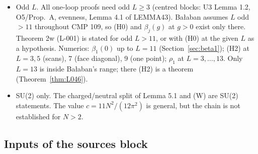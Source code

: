 \begin{itemize}
\item[11.] Odd $L$. All one-loop proofs need odd $L\ge3$ (centred blocks: U3 Lemma 1.2, O5/Prop.\ A, evenness, Lemma 4.1 of LEMMA43). Ba{\l}aban assumes $L$ odd $>11$ throughout CMP 109, so (H0) and $\beta_j(g)$ at $g>0$ exist only there. Theorem 2w (L-001) is stated for odd $L>11$, or with (H0) at the given $L$ as a hypothesis. Numerics: $\beta_1(0)$ up to $L=11$ (Section~\ref{sec:beta1}); (H2) at $L=3,5$ (scans), 7 (face diagonal), 9 (one point); $\rho_1$ at $L=3,\dots,13$. Only $L=13$ is inside Ba{\l}aban's range; there (H2) is a theorem (Theorem~\ref{thm:L046}).
\item[12.] SU(2) only. The charged/neutral split of Lemma 5.1 and (W) are SU(2) statements. The value $c=11N^2/(12\pi^2)$ is general, but the chain is not established for $N>2$.
\end{itemize}

\subsection{Inputs of the sources block}\label{sec:rem-sources}

